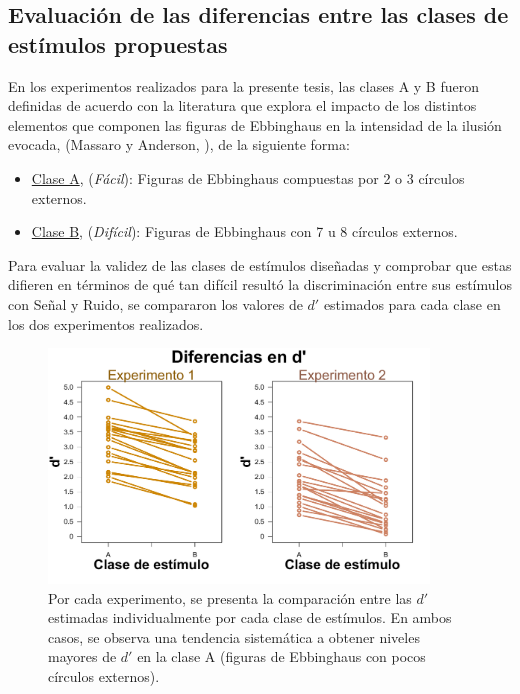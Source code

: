 \subsection{Evaluación de las diferencias entre las clases de estímulos propuestas}

En los experimentos realizados para la presente tesis, las clases A y B fueron definidas de acuerdo con la literatura que explora el impacto de los distintos elementos que componen las figuras de Ebbinghaus en la intensidad de la ilusión evocada, (Massaro y Anderson, \citeyear{Massaro1971}), de la siguiente forma:

\begin{itemize}
\item \underline{Clase A}, (\textit{Fácil}): Figuras de Ebbinghaus compuestas por 2 o 3 círculos externos.

\item \underline{Clase B}, (\textit{Difícil}): Figuras de Ebbinghaus con 7 u 8 círculos externos.\\
\end{itemize}

Para evaluar la validez de las clases de estímulos diseñadas y comprobar que estas difieren en términos de qué tan difícil resultó la discriminación entre sus estímulos con Señal y Ruido, se compararon los valores de $d'$ estimados para cada clase en los dos experimentos realizados.\\

\begin{figure}[th]
\centering
\includegraphics[width=0.90\textwidth]{Figures/Diff_D_E1yE2}
\decoRule
\caption[Resultados: Comparación de las $d'$ computadas por cada clase de estímulos]{Por cada experimento, se presenta la comparación entre  las $d'$ estimadas individualmente por cada clase de estímulos. En ambos casos, se observa una tendencia sistemática a obtener niveles mayores de $d'$ en la clase A (figuras de Ebbinghaus con pocos círculos externos).}
\label{fig:Diff_D}
\end{figure}

